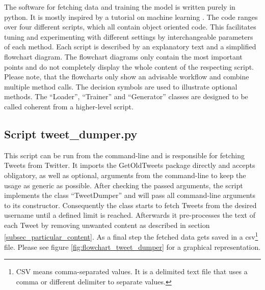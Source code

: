 \documentclass[conference]{IEEEtran}
\begin{document}
The software for fetching data and training the model is written purely in python. It is mostly inspired by a tutorial on machine learning \cite{tutrob}. The code ranges over four different scripts, which all contain object oriented code. This facilitates tuning and experimenting with different settings by interchangeable parameters of each method. Each script is described by an explanatory text and a simplified flowchart diagram. The flowchart diagrams only contain the most important points and do not completely display the whole content of the respecting script. Please note, that the flowcharts only show an advisable workflow and combine multiple method calls. The decision symbols are used to illustrate optional methods. The ``Loader'', ``Trainer'' and ``Generator'' classes are designed to be called coherent from a higher-level script.

\subsection{Script tweet\_dumper.py}

This script can be run from the command-line and is responsible for fetching Tweets from Twitter. It imports the GetOldTweets package directly and accepts obligatory, as well as optional, arguments from the command-line to keep the usage as generic as possible. After checking the passed arguments, the script implements the class ``TweetDumper'' and will pass all command-line arguments to its constructor. Consequently the class starts to fetch Tweets from the desired username until a defined limit is reached. Afterwards it pre-processes the text of each Tweet by removing unwanted content as described in section \ref{subsec_particular_content}. As a final step the fetched data gets saved in a csv\footnote{CSV means comma-separated values. It is a delimited text file that uses a comma or different delimiter to separate values.} file. Please see figure \ref{fig:flowchart_tweet_dumper} for a graphical representation.
\end{document}

